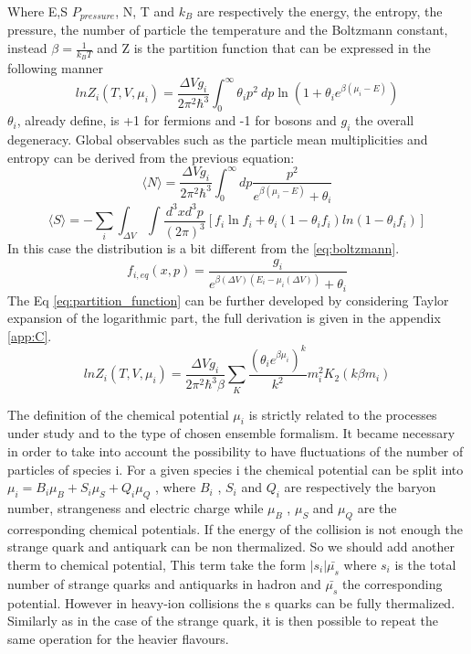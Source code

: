 \documentclass[12pt,a4paper]{book}
\begin{document}
	
	Where E,S $P_{pressure}$, N, T and $k_B$ are respectively the energy, the entropy, the pressure, the number of particle the temperature and the Boltzmann constant, instead $\beta=\frac{1}{k_BT}$ and Z is the partition function that can be expressed in the following manner
	\begin{equation}
		ln Z_i(T,V,\mu_i)= \frac{\Delta V g_i}{2\pi^2\hbar^3} \int_{0}^{\infty} \theta_i p^2 \  dp \ln(1+\theta_i e^{\beta(\mu_i-E)})
		\label{eq:partition_function}
	\end{equation}
	$\theta_i$, already define, is +1 for fermions and -1 for bosons and $g_i$ the overall degeneracy. Global observables such as the
	particle mean multiplicities and entropy can be derived from the previous equation:
	\begin{equation}
		\langle N \rangle = \frac{\Delta V g_i}{2\pi^2\hbar^3} \int_{0}^{\infty} dp \frac{p^2}{e^{\beta(\mu_i-E)}+\theta_i} 
		\label{eq:mean_particle_number}
	\end{equation}
	\begin{equation}
		\langle S \rangle= -\sum_{i} \int_{\Delta V} \int \frac{d^3x d^3p}{(2\pi)^3} \left[f_i \ln f_i + \theta_i (1-\theta_if_i)ln(1-\theta_if_i) \right]
		\label{eq:entropy}
	\end{equation}
	In this case the distribution is a bit different from the \ref{eq:boltzmann}.
	\begin{equation}
		f_{i,eq}(x,p)=\frac{g_i}{e^{\beta(\Delta V)(E_i-\mu_i(\Delta V))} +\theta_i} 
		\label{eq:boltmann2}
	\end{equation}
	The Eq \ref{eq:partition_function} can be further developed by considering  Taylor expansion of the logarithmic part, the full derivation is given in the appendix \ref{app:C}.
	\begin{equation}
		ln Z_i(T,V,\mu_i)= \frac{\Delta V g_i}{2\pi^2\hbar^3\beta} \sum_{K} \frac{(\theta_i e^{\beta \mu_i})^k}{k^2} m_i^2K_2(k\beta m_i)
		\label{eq:partition_function2}
	\end{equation}
	
	The definition of the chemical potential $\mu_i$ is strictly related to the processes under study and to the type of chosen ensemble formalism. It became necessary in order to take into account the possibility to have fluctuations of the number of particles of species i. For a given species i the chemical potential can be split into $\mu_i = B_i \mu_B + S_i \mu_S + Q_i \mu_Q$ , where $B_i$ , $S_i$ and $Q_i$ are respectively the baryon number, strangeness and electric charge while $\mu_B$ , $\mu_S$ and $\mu_Q$ are the corresponding chemical potentials. If the energy of the collision is not enough the strange quark and antiquark can be non thermalized. So we should add another therm to chemical potential, This term take the form $|s_i| \bar{\mu_s}$ where $s_i$ is the total number of strange quarks and antiquarks in hadron and $\bar{\mu_s}$ the corresponding potential. However in heavy-ion collisions the s quarks can be fully thermalized. Similarly as in the case of the strange quark, it is then possible to repeat the same operation for the heavier flavours.
	
\end{document}
